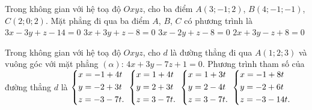 \begin{ex}%
Trong không gian với hệ toạ độ $Oxyz$, cho ba điểm $A(3;-1;2)$, $B(4;-1;-1)$, $C(2;0;2)$. Mặt phẳng đi qua ba điểm $A$, $B$, $C$ có phương trình là
\choice
{$3x-3y+z-14=0$}
{\True $3x+3y+z-8=0$}
{$3x-2y+z-8=0$}
{$2x+3y-z+8=0$}
\end{ex}

\begin{ex}%
\def\dotEX{}
Trong không gian với hệ toạ độ $Oxyz$, cho $d$ là đường thẳng đi qua $A(1;2;3)$ và vuông góc với mặt phẳng $(\alpha )$: $4x+3y-7z+1=0$. Phương trình tham số của đường thẳng $d$ là
\choice
{$\left\{\begin{aligned}&x=-1+4t\\&y=-2+3t\\&z=-3-7t.\end{aligned}\right.$}
{\True $\left\{\begin{aligned}&x=1+4t\\&y=2+3t\\&z=3-7t.\end{aligned}\right.$}
{$\left\{\begin{aligned}&x=1+3t\\&y=2-4t\\&z=3-7t.\end{aligned}\right.$}
{$\left\{\begin{aligned}&x=-1+8t\\&y=-2+6t\\&z=-3-14t.\end{aligned}\right.$}
\end{ex}

